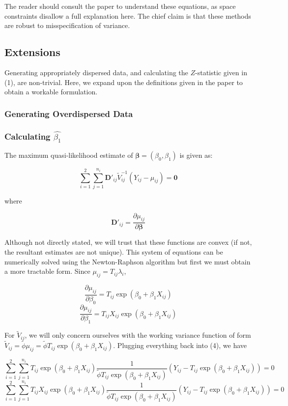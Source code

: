 \documentclass{article}
\begin{document}
The reader should consult the paper to understand these equations, as
space constraints disallow a full explanation here. The chief claim
is that these methods are robust to misspecification of variance.

\subsection{Extensions}

Generating appropriately dispersed data, and calculating the $Z$-statistic given
in (1), are non-trivial. Here, we expand upon
the definitions given in the paper to obtain a workable formulation.

\subsubsection{Generating Overdispersed Data}

\subsubsection{Calculating $\hat{\beta_1}$}

The maximum quasi-likelihood estimate of $\bm{\beta}=(\beta_0, \beta_1)$ is
given as:

\begin{equation}
\sum_{i=1}^2 \sum_{j=1}^{n_i} \bm{D}'_{ij} \tilde{V}_{ij}^{-1}(Y_{ij}-\mu_{ij})
= \bm{0}
\end{equation}

where 

$$
\bm{D}'_{ij} = \frac{\partial \mu_{ij}}{\partial \bm{\beta}}
$$ 

Although not directly stated, we will trust that these functions are convex (if
not, the resultant estimates are not unique). This system of equations can be numerically solved using the 
Newton-Raphson algorithm but first we must obtain a more tractable form. Since $\mu_{ij} = T_{ij}\lambda_i$,

$$
\frac{\partial \mu_{ij}}{\partial \beta_0} = T_{ij} \exp{(\beta_0 + \beta_1 X_{ij})}
$$
$$
\frac{\partial \mu_{ij}}{\partial \beta_1} = T_{ij}X_{ij} \exp{(\beta_0 + \beta_1 X_{ij})}
$$

For $\tilde{V}_{ij}$, we will only concern ourselves with the working variance
function of form $\tilde{V}_{ij} = \tilde{\phi} \mu_{ij} =
\tilde{\phi} T_{ij} \exp{(\beta_0 + \beta_1 X_{ij})}$. Plugging everything back into
(4), we have

$$
\sum_{i=1}^2 \sum_{j=1}^{n_i}  T_{ij} \exp{(\beta_0 + \beta_1 X_{ij})}
\frac{1}{\tilde{\phi} T_{ij} \exp{(\beta_0 + \beta_1 X_{ij})}} 
(Y_{ij} - T_{ij} \exp{(\beta_0 + \beta_1 X_{ij})}) = 0
$$
$$
\sum_{i=1}^2 \sum_{j=1}^{n_i} T_{ij} X_{ij} \exp{(\beta_0 + \beta_1 X_{ij})}
\frac{1}{\tilde{\phi} T_{ij} \exp{(\beta_0 + \beta_1 X_{ij})}} 
(Y_{ij} - T_{ij} \exp{(\beta_0 + \beta_1 X_{ij})}) = 0
$$
\end{document}
